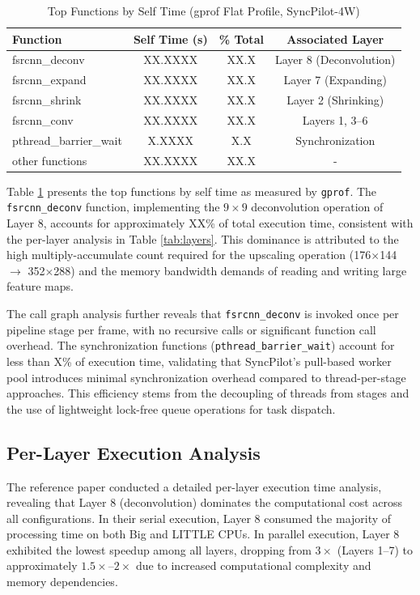 \documentclass[runningheads]{llncs}
\begin{document}
\begin{table}
\caption{Top Functions by Self Time (gprof Flat Profile, SyncPilot-4W)}\label{tab:gprof}
\centering
\small
\begin{tabular}{|l|c|c|c|}
\hline
\textbf{Function} & \textbf{Self Time (s)} & \textbf{\% Total} & \textbf{Associated Layer} \\
\hline
fsrcnn\_deconv & XX.XXXX & XX.X & Layer 8 (Deconvolution) \\
fsrcnn\_expand & XX.XXXX & XX.X & Layer 7 (Expanding) \\
fsrcnn\_shrink & XX.XXXX & XX.X & Layer 2 (Shrinking) \\
fsrcnn\_conv & XX.XXXX & XX.X & Layers 1, 3--6 \\
pthread\_barrier\_wait & X.XXXX & X.X & Synchronization \\
other functions & XX.XXXX & XX.X & - \\
\hline
\end{tabular}
\end{table}

Table \ref{tab:gprof} presents the top functions by self time as measured by \texttt{gprof}. The \texttt{fsrcnn\_deconv} function, implementing the $9\times9$ deconvolution operation of Layer 8, accounts for approximately XX\% of total execution time, consistent with the per-layer analysis in Table \ref{tab:layers}. This dominance is attributed to the high multiply-accumulate count required for the upscaling operation (176$\times$144 $\rightarrow$ 352$\times$288) and the memory bandwidth demands of reading and writing large feature maps.

The call graph analysis further reveals that \texttt{fsrcnn\_deconv} is invoked once per pipeline stage per frame, with no recursive calls or significant function call overhead. The synchronization functions (\texttt{pthread\_barrier\_wait}) account for less than X\% of execution time, validating that SyncPilot's pull-based worker pool introduces minimal synchronization overhead compared to thread-per-stage approaches. This efficiency stems from the decoupling of threads from stages and the use of lightweight lock-free queue operations for task dispatch.

\subsection{Per-Layer Execution Analysis}
The reference paper \cite{annisa2025fsrcnn} conducted a detailed per-layer execution time analysis, revealing that Layer 8 (deconvolution) dominates the computational cost across all configurations. In their serial execution, Layer 8 consumed the majority of processing time on both Big and LITTLE CPUs. In parallel execution, Layer 8 exhibited the lowest speedup among all layers, dropping from $3\times$ (Layers 1--7) to approximately $1.5\times$--$2\times$ due to increased computational complexity and memory dependencies.
\end{document}
